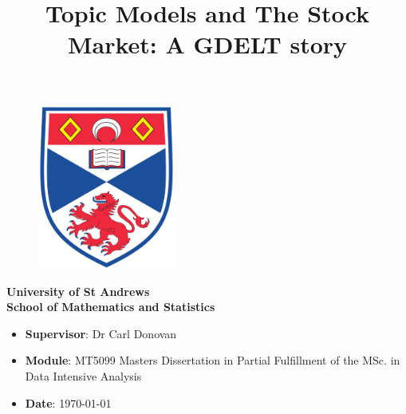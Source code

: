 \documentclass[a4paper]{article}
\begin{document}
\title{Topic Models and The Stock Market: A GDELT story}
\author{}
\date{}
 \thispagestyle{empty}
	
	\begin{titlepage}
		\vspace{\fill}
		\maketitle
		 \thispagestyle{empty}
		\begin{figure}[H]
			\centering
			\includegraphics[width=0.4\textwidth]{Images/SchoolLogo.png}
		\end{figure}
		\begin{center}
			\Large\textbf{University of St Andrews}\\
			\vspace{1cm}
			\Large\textbf{School of Mathematics and Statistics}
		\end{center}
		
		\vspace{\fill}
		\Large%
		\begin{itemize}
			\renewcommand\labelitemi{--}
			\item[] \textbf{Supervisor}: Dr Carl Donovan  
			\item[] \textbf{Module}: MT5099 Masters Dissertation in Partial Fulfillment of the MSc. in Data Intensive Analysis
			\item[] \textbf{Date}: \today
		\end{itemize}
		\vspace{\fill}
	\end{titlepage}


\tableofcontents
\listoftables
\newpage
\listoffigures












\end{document}
